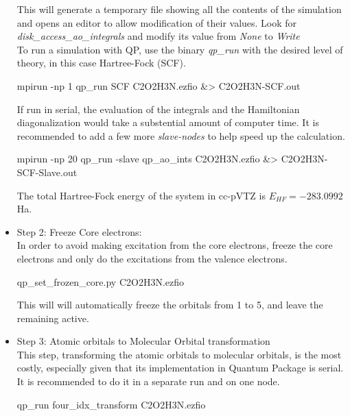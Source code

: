 \begin{itemize}
This will generate a temporary file showing all the contents of the simulation and opens an editor to allow modification of their values. Look for \textit{disk\_access\_ao\_integrals} and modify its value from \textit{None} to \textit{Write}\\

To run a simulation with QP, use the binary \textit{qp\_run} with the desired level of theory, in this case Hartree-Fock (SCF). \\
\begin{shade}
mpirun -np 1 qp_run SCF C2O2H3N.ezfio &> C2O2H3N-SCF.out 
\end{shade}

If run in serial, the evaluation of the integrals and the Hamiltonian diagonalization would take a substential amount of computer time. It is recommended to add a few more \textit{slave-nodes} to help speed up the calculation.\\

\begin{shade}
mpirun -np 20 qp_run -slave qp_ao_ints C2O2H3N.ezfio &> C2O2H3N-SCF-Slave.out 
\end{shade}
The total Hartree-Fock energy of the system in cc-pVTZ is \textit{$E_{HF}=-283.0992$}Ha.\\ 
\item Step 2: Freeze Core electrons:\\
In order to avoid making excitation from the core electrons, freeze the core electrons and only do the excitations from the valence electrons.\\  
\begin{shade}
qp_set_frozen_core.py C2O2H3N.ezfio
\end{shade}
This will will automatically freeze the orbitals from 1 to 5, and leave the remaining active. \\
\item Step 3: Atomic orbitals to Molecular Orbital transformation\\
This step, transforming the atomic orbitals to molecular orbitals, is the most costly, especially given that its implementation in Quantum Package is serial. It is recommended to do it in a separate run and on one node.\\
\begin{shade}
qp_run four_idx_transform C2O2H3N.ezfio
\end{shade}


\end{itemize}
